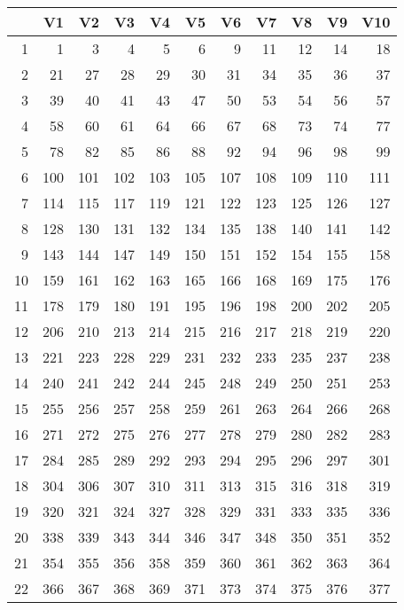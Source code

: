 \begin{longtable}{|r|rrrrrrrrrr|}
  \hline
 & V1 & V2 & V3 & V4 & V5 & V6 & V7 & V8 & V9 & V10 \\ 
  \hline
1 &   1 &   3 &   4 &   5 &   6 &   9 &  11 &  12 &  14 &  18 \\ 
  2 &  21 &  27 &  28 &  29 &  30 &  31 &  34 &  35 &  36 &  37 \\ 
  3 &  39 &  40 &  41 &  43 &  47 &  50 &  53 &  54 &  56 &  57 \\ 
  4 &  58 &  60 &  61 &  64 &  66 &  67 &  68 &  73 &  74 &  77 \\ 
  5 &  78 &  82 &  85 &  86 &  88 &  92 &  94 &  96 &  98 &  99 \\ 
  6 & 100 & 101 & 102 & 103 & 105 & 107 & 108 & 109 & 110 & 111 \\ 
  7 & 114 & 115 & 117 & 119 & 121 & 122 & 123 & 125 & 126 & 127 \\ 
  8 & 128 & 130 & 131 & 132 & 134 & 135 & 138 & 140 & 141 & 142 \\ 
  9 & 143 & 144 & 147 & 149 & 150 & 151 & 152 & 154 & 155 & 158 \\ 
  10 & 159 & 161 & 162 & 163 & 165 & 166 & 168 & 169 & 175 & 176 \\ 
  11 & 178 & 179 & 180 & 191 & 195 & 196 & 198 & 200 & 202 & 205 \\ 
  12 & 206 & 210 & 213 & 214 & 215 & 216 & 217 & 218 & 219 & 220 \\ 
  13 & 221 & 223 & 228 & 229 & 231 & 232 & 233 & 235 & 237 & 238 \\ 
  14 & 240 & 241 & 242 & 244 & 245 & 248 & 249 & 250 & 251 & 253 \\ 
  15 & 255 & 256 & 257 & 258 & 259 & 261 & 263 & 264 & 266 & 268 \\ 
  16 & 271 & 272 & 275 & 276 & 277 & 278 & 279 & 280 & 282 & 283 \\ 
  17 & 284 & 285 & 289 & 292 & 293 & 294 & 295 & 296 & 297 & 301 \\ 
  18 & 304 & 306 & 307 & 310 & 311 & 313 & 315 & 316 & 318 & 319 \\ 
  19 & 320 & 321 & 324 & 327 & 328 & 329 & 331 & 333 & 335 & 336 \\ 
  20 & 338 & 339 & 343 & 344 & 346 & 347 & 348 & 350 & 351 & 352 \\ 
  21 & 354 & 355 & 356 & 358 & 359 & 360 & 361 & 362 & 363 & 364 \\ 
  22 & 366 & 367 & 368 & 369 & 371 & 373 & 374 & 375 & 376 & 377 \\ 

\end{longtable}
